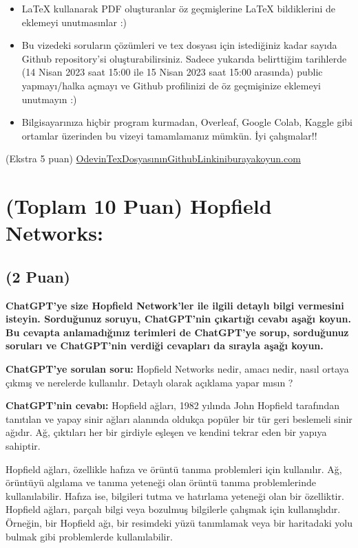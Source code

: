 \documentclass[11pt]{article}
\begin{document}
\begin{itemize}
    \item LaTeX kullanarak PDF oluşturanlar öz geçmişlerine LaTeX bildiklerini de eklemeyi unutmasınlar :)
    \item Bu vizedeki soruların çözümleri ve tex dosyası için istediğiniz kadar sayıda Github repository'si oluşturabilirsiniz. Sadece yukarıda belirttiğim tarihlerde (14 Nisan 2023 saat 15:00 ile 15 Nisan 2023 saat 15:00 arasında) public yapmayı/halka açmayı ve Github profilinizi de öz geçmişinize eklemeyi unutmayın :)
    \item Bilgisayarınıza hiçbir program kurmadan, Overleaf, Google Colab, Kaggle gibi ortamlar üzerinden bu vizeyi tamamlamanız mümkün. İyi çalışmalar!!
\end{itemize}

(Ekstra 5 puan) \url{OdevinTexDosyasınınGithubLinkiniburayakoyun.com}

\newpage
\section{(Toplam 10 Puan) Hopfield Networks:}

\subsection{(2 Puan)} \textbf{ChatGPT’ye size Hopfield Network’ler ile ilgili detaylı bilgi vermesini isteyin. Sorduğunuz soruyu, ChatGPT'nin çıkartığı cevabı aşağı koyun. Bu cevapta anlamadığınız terimleri de ChatGPT’ye sorup, sorduğunuz soruları ve ChatGPT’nin verdiği cevapları da sırayla aşağı koyun.}

\textbf{ChatGPT'ye sorulan soru: }Hopfield Networks nedir, amacı nedir, nasıl ortaya çıkmış ve nerelerde kullanılır. Detaylı olarak açıklama yapar mısın ?

\textbf{ChatGPT'nin cevabı: } Hopfield ağları, 1982 yılında John Hopfield tarafından tanıtılan ve yapay sinir ağları alanında oldukça popüler bir tür geri beslemeli sinir ağıdır. Ağ, çıktıları her bir girdiyle eşleşen ve kendini tekrar eden bir yapıya sahiptir.

Hopfield ağları, özellikle hafıza ve örüntü tanıma problemleri için kullanılır. Ağ, örüntüyü algılama ve tanıma yeteneği olan örüntü tanıma problemlerinde kullanılabilir. Hafıza ise, bilgileri tutma ve hatırlama yeteneği olan bir özelliktir. Hopfield ağları, parçalı bilgi veya bozulmuş bilgilerle çalışmak için kullanışlıdır. Örneğin, bir Hopfield ağı, bir resimdeki yüzü tanımlamak veya bir haritadaki yolu bulmak gibi problemlerde kullanılabilir.
\end{document}
